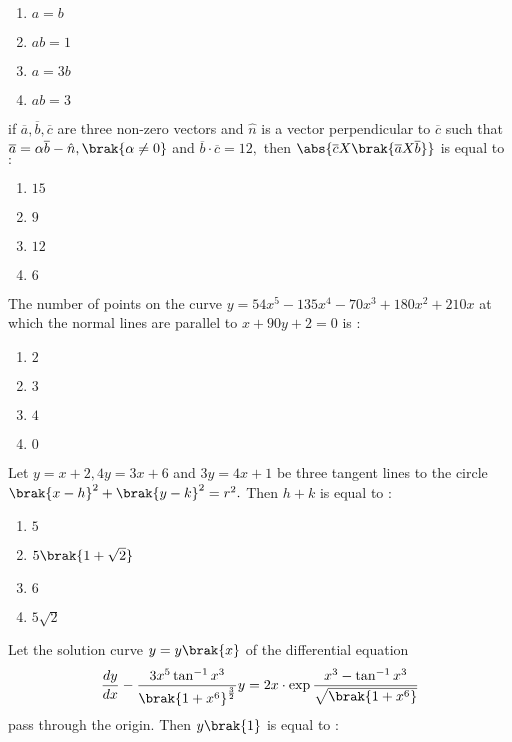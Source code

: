 	   \hfill{} \\
    \begin{enumerate}
        \item $a=b$
        \item $ab=1$
        \item $a=3b$
        \item $ab=3$
    \end{enumerate}
    \item if $\overline{a},\overline{b},\overline{c}$ are three non-zero vectors and $\hat{n}$ is a vector perpendicular to $\overline{c}$ such that $\overline{a}=\alpha\overline{b}-\hat{n},\brak{\alpha\neq 0}$ and $\overline{b}\cdot\overline{c}=12,$ then $\abs{\overline{c}X\brak{\overline{a}X\overline{b}}}$ is equal to $:$
	  \hfill{}  \\
    \begin{enumerate}
        \item $15$
        \item $9$
        \item $12$
        \item $6$
    \end{enumerate}
    \item The number of points on the curve $y=54x^5-135x^4-70x^3+180x^2+210x$ at which the normal lines are parallel to $x+90y+2=0$ is $:$
	  \hfill{}  \\
    \begin{enumerate}
        \item $2$
        \item $3$
        \item $4$
        \item $0$
    \end{enumerate}
    \item Let $y=x+2,4y=3x+6$ and $3y=4x+1$ be three tangent lines to the circle $\brak{x-h}^2+\brak{y-k}^2=r^2.$ Then $h+k$ is equal to $:$
	   \hfill{} \\
    \begin{enumerate}
        \item $5$
        \item $5\brak{1+\sqrt{2}}$
        \item $6$
        \item $5\sqrt{2}$
    \end{enumerate}
    \item Let the solution curve $y=y\brak{x}$ of the differential equation $$\frac{dy}{dx}-\frac{3x^5\tan^{-1}x^3}{\brak{1+x^6}^{\frac{3}{2}}}y=2x\cdot \exp{\frac{x^3-\tan^{-1}x^3}{\sqrt{\brak{1+x^6}}}}$$ pass through the origin. Then $y\brak{1}$ is equal to $:$
